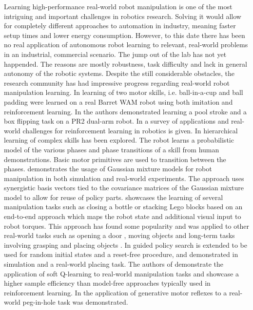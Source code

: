 Learning high-performance real-world robot manipulation is one of the most intriguing and important challenges in robotics research.
Solving it would allow for completely different approaches to automation in industry, meaning faster setup times and lower energy consumption.
However, to this date there has been no real application of autonomous robot learning to relevant, real-world problems in an industrial, commercial scenario.
The jump out of the lab has not yet happended.
The reasons are mostly robustness, task difficulty and lack in general autonomy of the robotic systems.
Despite the still considerable obstacles, the research community has had impressive progress regarding real-world robot manipulation learning.
In \cite{Kober.2009} learning of two motor skills, i.e. ball-in-a-cup and ball padding were learned on a real Barret WAM robot using both imitation and reinforcement learning.
In \cite{Pastor.2011} the authors demonstrated learning a pool stroke and a box flipping task on a PR2 dual-arm robot.
In \cite{Kormushev.2013} a survey of applications and real-world challenges for reinforcement learning in robotics is given.
In \cite{Kroemer.2015} hierarchical learning of complex skills has been explored.
The robot learns a probabilistic model of the various phases and phase transitions of a skill from human demonstrations.
Basic motor primitives are used to transition between the phases.
\cite{Tanwani.2016} demonstrates the usage of Gaussian mixture models for robot manipulation in both simulation and real-world experiments.
The approach uses synergistic basis vectors tied to the covariance matrices of the Gaussian mixture model to allow for reuse of policy parts.
\cite{Levine.2015,Levine.2016} showcases the learning of several manipulation tasks such as closing a bottle or stacking Lego blocks based on an end-to-end approach which maps the robot state and additional visual input to robot torques.
This approach has found some popularity and was applied to other real-world tasks such as opening a door \cite{Gu.2017}, moving objects \cite{Devin.2018} and long-term tasks involving grasping and placing objects \cite{James.2019}.
In \cite{Montgomery.2017} guided policy search is extended to be used for random initial states and a reset-free procedure, and demonstrated in simulation and a real-world placing task.
The authors of \cite{Haarnoja.2018} demonstrate the application of soft Q-learning to real-world manipulation tasks and showcase a higher sample efficiency than model-free approaches typically used in reinforcement learning.
In \cite{Ennen.2019} the application of generative motor reflexes to a real-world peg-in-hole task was demonstrated.

